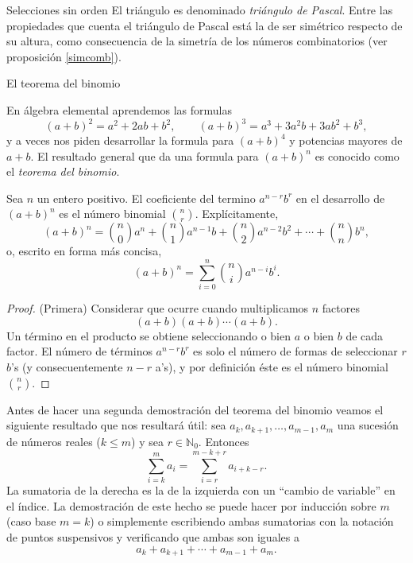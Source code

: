 \begin{section}{Selecciones sin orden}
El  triángulo es denominado \emph{triángulo de Pascal}. Entre las propiedades que cuenta el triángulo de Pascal está la de ser simétrico respecto de su altura, como consecuencia de la simetría de los números combinatorios (ver proposición \ref{simcomb}). 





\end{section}


\begin{section}{El teorema del binomio}

En álgebra elemental aprendemos las formulas
$$
(a+b)^2 = a^2 +2ab +b^2, \qquad (a+b)^3 = a^3 + 3 a^2b +3ab^2 +
b^3,
$$
y a veces nos piden desarrollar la formula para $(a+b)^4$ y
potencias mayores de $a+b$. El resultado general que da una
formula para $(a+b)^n$ es conocido como el
 {\it {teorema del binomio}}.  

\begin{teorema}\label{t3.6}
Sea $n$ un entero positivo. El coeficiente del termino
$a^{n-r}b^r$ en el desarrollo de $(a+b)^n$ es el número binomial
$\binom{n}{r}$. Explícitamente,
\begin{equation*}
(a+b)^n= \binom{n}{0} a^n + \binom{n}{1} a^{n-1}b+ \binom{n}{2}
a^{n-2}b^2 + \cdots + \binom{n}{n} b^n,
\end{equation*}
o,  escrito en forma más concisa, 
\begin{equation}\label{eq-th-bin-1}
(a+b)^n= \sum_{i=0}^{n}\binom{n}{i} a^{n-i}b^i.
\end{equation}

\end{teorema}
\begin{proof}(Primera) Considerar que ocurre cuando
multiplicamos $n$ factores
$$
(a+b)(a+b) \cdots (a+b).
$$
Un término en el producto se obtiene seleccionando o bien $a$ o
bien $ b$ de cada factor. El número de términos $a^{n-r}b^r$ es
solo el número de formas de seleccionar $r$ $b$'s (y
consecuentemente $n-r$ a's), y por definición éste es el número
binomial $\binom{n}{r}$.
\end{proof}


\begin{observacion}\label{cvar} Antes de hacer una segunda demostración del teorema del binomio veamos el siguiente resultado que nos resultará útil: sea $a_k,a_{k+1},\ldots,a_{m-1},a_m$ una sucesión de números reales ($k \le m$) y sea $r \in \mathbb N_0$.  Entonces
$$
\sum_{i=k}^m a_i = \sum_{i=r}^{m-k+r} a_{i+k-r}.
$$ 
La sumatoria de la derecha es la de la izquierda con un ``cambio de variable'' en el índice. La demostración de este hecho se puede hacer por inducción sobre $m$ (caso base $m=k$) o simplemente escribiendo ambas sumatorias con la notación de puntos suspensivos y verificando que ambas son iguales a
$$
a_k+a_{k+1}+\cdots+a_{m-1}+a_m.
$$  
\end{observacion}



\end{section}
